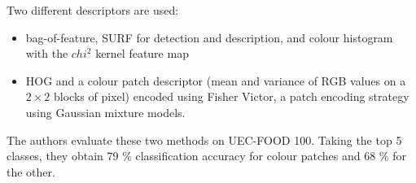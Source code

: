 Two different descriptors are used:
\begin{itemize}
    \item bag-of-feature, SURF for detection and description, and colour histogram with the $chi^2$ kernel feature map
    \item HOG and a colour patch descriptor (mean and variance of RGB values on a $2 \times 2$ blocks of pixel) encoded using Fisher Victor, a patch encoding strategy using Gaussian mixture models.
\end{itemize}
The authors evaluate these two methods on UEC-FOOD 100. Taking the top 5 classes, they obtain 79 \% classification accuracy for colour patches and 68 \% for the other.